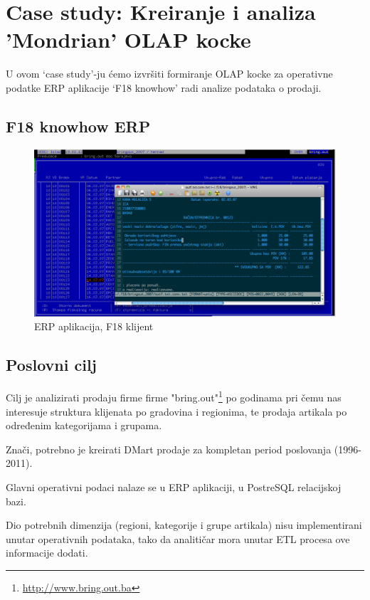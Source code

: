 \documentclass[times, utf8, seminar]{fit}
\begin{document}
\chapter{Case study: Kreiranje i analiza 'Mondrian' OLAP kocke}
\label{chap:case_study}

U ovom `case study'-ju ćemo izvršiti formiranje OLAP kocke za operativne podatke ERP aplikacije `F18 knowhow' radi analize podataka o prodaji.  

\section{F18 knowhow ERP}

\begin{figure}[H]
\centering
\includegraphics[width=15cm]{img/F18_erp.png}
\caption{ERP aplikacija, F18 klijent}
\end{figure}

\section{Poslovni cilj}

Cilj je analizirati prodaju firme firme "bring.out"\footnote{\url{http://www.bring.out.ba}} po godinama pri čemu nas interesuje struktura klijenata po gradovina i regionima, te prodaja artikala po određenim kategorijama i grupama.

Znači, potrebno je kreirati DMart prodaje za kompletan period poslovanja (1996-2011). 

Glavni operativni podaci nalaze se u ERP aplikaciji, u PostreSQL relacijskoj bazi. 

Dio potrebnih dimenzija (regioni, kategorije i grupe artikala) nisu implementirani unutar operativnih podataka, tako da analitičar mora unutar ETL procesa ove informacije dodati. 
\end{document}
